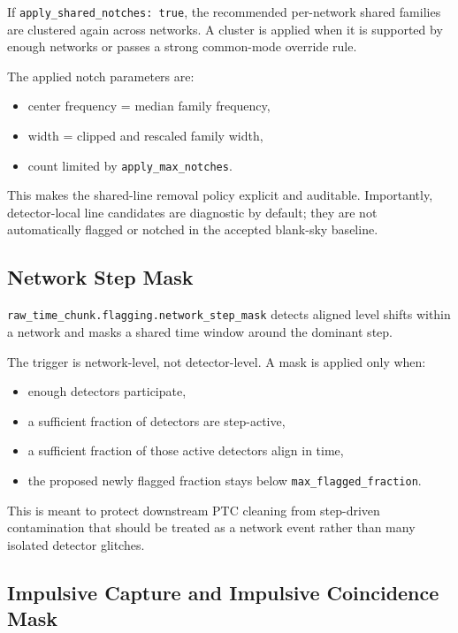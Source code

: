 \documentclass[11pt]{article}
\begin{document}
If \texttt{apply\_shared\_notches: true}, the recommended per-network shared
families are clustered again across networks. A cluster is applied when it is
supported by enough networks or passes a strong common-mode override rule.

The applied notch parameters are:

\begin{itemize}[leftmargin=1.5em]
\item center frequency = median family frequency,
\item width = clipped and rescaled family width,
\item count limited by \texttt{apply\_max\_notches}.
\end{itemize}

This makes the shared-line removal policy explicit and auditable. Importantly,
detector-local line candidates are diagnostic by default; they are not
automatically flagged or notched in the accepted blank-sky baseline.

\subsection{Network Step Mask}

\texttt{raw\_time\_chunk.flagging.network\_step\_mask} detects aligned level
shifts within a network and masks a shared time window around the dominant step.

The trigger is network-level, not detector-level. A mask is applied only when:

\begin{itemize}[leftmargin=1.5em]
\item enough detectors participate,
\item a sufficient fraction of detectors are step-active,
\item a sufficient fraction of those active detectors align in time,
\item the proposed newly flagged fraction stays below
\texttt{max\_flagged\_fraction}.
\end{itemize}

This is meant to protect downstream PTC cleaning from step-driven contamination
that should be treated as a network event rather than many isolated detector
glitches.

\subsection{Impulsive Capture and Impulsive Coincidence Mask}
\end{document}
